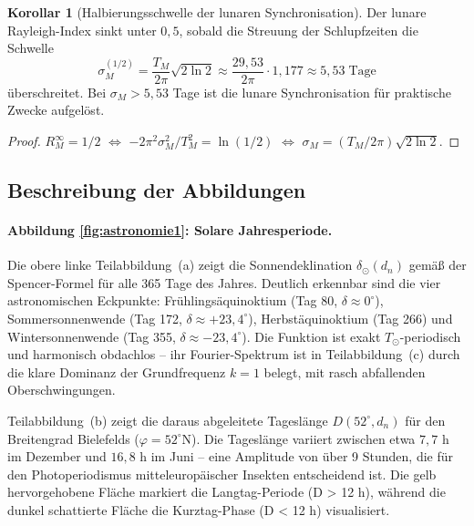 ﻿\documentclass[12pt, a4paper]{article}
\theoremstyle{definition}
\newtheorem{korollar}[theorem]{Korollar}
\begin{document}
\begin{korollar}[Halbierungsschwelle der lunaren Synchronisation]\label{cor:lunar-half}
Der lunare Rayleigh-Index sinkt unter $0{,}5$, sobald die Streuung der Schlupfzeiten
die Schwelle
\begin{equation}\label{eq:sigma-half}
  \sigma_M^{(1/2)} = \frac{T_M}{2\pi}\sqrt{2\ln 2} \approx \frac{29{,}53}{2\pi}\cdot 1{,}177
  \approx 5{,}53\;\text{Tage}
\end{equation}
überschreitet. Bei $\sigma_M > 5{,}53$ Tage ist die lunare Synchronisation für
praktische Zwecke aufgelöst.
\end{korollar}

\begin{proof}
$R_M^{\infty} = 1/2$ $\Leftrightarrow$ $-2\pi^2\sigma_M^2/T_M^2 = \ln(1/2)$
$\Leftrightarrow$ $\sigma_M = (T_M/2\pi)\sqrt{2\ln 2}$. \hfill
\end{proof}

\subsection{Beschreibung der Abbildungen}

\paragraph{Abbildung \ref{fig:astronomie1}: Solare Jahresperiode.}
Die obere linke Teilabbildung~(a) zeigt die Sonnendeklination $\delta_{\odot}(d_n)$
gemäß der Spencer-Formel für alle 365 Tage des Jahres.
Deutlich erkennbar sind die vier astronomischen Eckpunkte: Frühlingsäquinoktium
(Tag 80, $\delta \approx 0^\circ$), Sommersonnenwende (Tag 172, $\delta \approx +23{,}4^\circ$),
Herbstäquinoktium (Tag 266) und Wintersonnenwende (Tag 355, $\delta \approx -23{,}4^\circ$).
Die Funktion ist exakt $T_{\odot}$-periodisch und harmonisch obdachlos -- ihr
Fourier-Spektrum ist in Teilabbildung~(c) durch die klare Dominanz der
Grundfrequenz $k=1$ belegt, mit rasch abfallenden Oberschwingungen.

Teilabbildung~(b) zeigt die daraus abgeleitete Tageslänge $D(52^\circ, d_n)$ für
den Breitengrad Bielefelds ($\varphi = 52^\circ$N). Die Tageslänge variiert zwischen
etwa $7{,}7$ h im Dezember und $16{,}8$ h im Juni -- eine Amplitude von über
9 Stunden, die für den Photoperiodismus mitteleuropäischer Insekten entscheidend ist.
Die gelb hervorgehobene Fläche markiert die Langtag-Periode (D > 12 h), während
die dunkel schattierte Fläche die Kurztag-Phase (D < 12 h) visualisiert.
\end{document}
